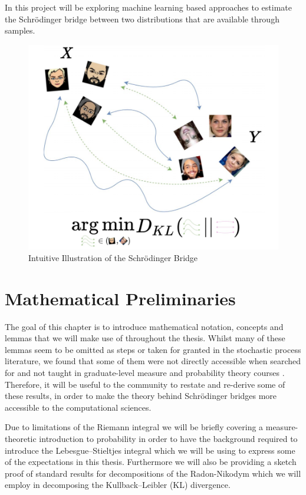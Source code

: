 \documentclass[a4paper,12pt,twoside,openright]{report}
\theoremstyle{definition}
\begin{document}
 In this project will be exploring machine learning based approaches to estimate the Schrödinger bridge between two distributions that are available through samples.
\begin{figure}
    \centering
    \includegraphics[scale=0.7]{images/charicaturistic_bridge.PNG}
    \caption{Intuitive Illustration of the Schrödinger Bridge}
    \label{fig:intuitive_bridge}
\end{figure}

 
\chapter{Mathematical Preliminaries}


The goal of this chapter is to introduce mathematical notation, concepts and lemmas that we will make use of throughout the thesis. Whilst many of these lemmas seem to be omitted as steps or taken for granted in the stochastic process literature, we found that some of them were not directly accessible when searched for and not taught in graduate-level measure and probability theory courses \citep{ethmeasure,mitmeasure,cambprob}. Therefore, it will be useful to the community to restate and re-derive some of these results, in order to make the theory behind Schrödinger bridges more accessible to the computational sciences.

Due to limitations of the Riemann integral we will be briefly covering a measure-theoretic introduction to probability in order to have the background required to introduce the  Lebesgue–Stieltjes integral which we will be using to express some of the expectations in this thesis. Furthermore we will also be providing a sketch proof of standard results for decompositions of the Radon-Nikodym which we will employ in decomposing the Kullback–Leibler  (KL) divergence. 
\end{document}

